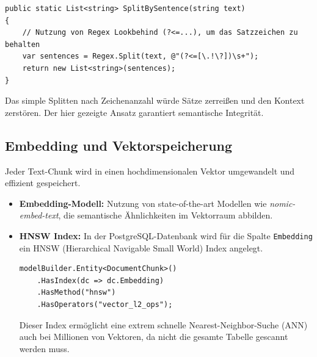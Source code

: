 \begin{lstlisting}[language={[Sharp]C}, caption={Implementierung der Satz-Segmentierung in TextChunker.cs}]
public static List<string> SplitBySentence(string text)
{
    // Nutzung von Regex Lookbehind (?<=...), um das Satzzeichen zu behalten
    var sentences = Regex.Split(text, @"(?<=[\.!\?])\s+");
    return new List<string>(sentences);
}
\end{lstlisting}
Das simple Splitten nach Zeichenanzahl würde Sätze zerreißen und den Kontext zerstören. Der hier gezeigte Ansatz garantiert semantische Integrität.

\subsection{Embedding und Vektorspeicherung}
Jeder Text-Chunk wird in einen hochdimensionalen Vektor umgewandelt und effizient gespeichert.
\begin{itemize}
    \item \textbf{Embedding-Modell:} Nutzung von state-of-the-art Modellen wie \textit{nomic-embed-text}, die semantische Ähnlichkeiten im Vektorraum abbilden.
    \item \textbf{HNSW Index:} In der PostgreSQL-Datenbank wird für die Spalte \texttt{Embedding} ein HNSW (Hierarchical Navigable Small World) Index \cite{malkov2018hnsw} angelegt.
    \begin{verbatim}
modelBuilder.Entity<DocumentChunk>()
    .HasIndex(dc => dc.Embedding)
    .HasMethod("hnsw")
    .HasOperators("vector_l2_ops");
    \end{verbatim}
    Dieser Index ermöglicht eine extrem schnelle Nearest-Neighbor-Suche (ANN) auch bei Millionen von Vektoren, da nicht die gesamte Tabelle gescannt werden muss.
\end{itemize}
